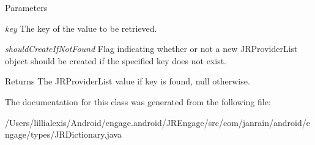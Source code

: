 \begin{DoxyParams}{Parameters}
\item[{\em key}]The key of the value to be retrieved.\item[{\em shouldCreateIfNotFound}]Flag indicating whether or not a new JRProviderList object should be created if the specified key does not exist.\end{DoxyParams}
\begin{DoxyReturn}{Returns}
The JRProviderList value if key is found, null otherwise. 
\end{DoxyReturn}


The documentation for this class was generated from the following file:\begin{DoxyCompactItemize}
\item 
/Users/lillialexis/Android/engage.android/JREngage/src/com/janrain/android/engage/types/JRDictionary.java\end{DoxyCompactItemize}

